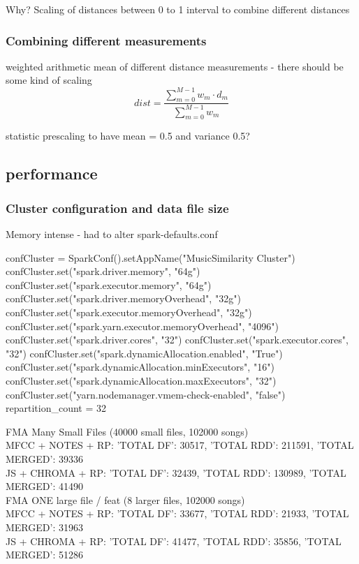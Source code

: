 Why? Scaling of distances between 0 to 1 interval to combine different distances\\

\subsubsection{Combining different measurements}

weighted arithmetic mean of different distance measurements - there should be some kind of scaling \cite[pp. 543ff]{musicdata}\\

\begin{equation} \label{eq:distance}
dist = \frac{\sum_{m = 0}^{M - 1}{w_m \cdot d_m}}{\sum_{m = 0}^{M - 1}{w_m}}
\end{equation}

statistic prescaling to have mean = 0.5 and variance 0.5?\\


\subsection{performance}\label{sparkperf}

\subsubsection{Cluster configuration and data file size}

Memory intense - had to alter spark-defaults.conf\\

\begin{pythonCode}[frame=single,label={lst:clust},caption={cluster setup},captionpos=b]
confCluster = SparkConf().setAppName("MusicSimilarity Cluster")
confCluster.set("spark.driver.memory", "64g")
confCluster.set("spark.executor.memory", "64g")
confCluster.set("spark.driver.memoryOverhead", "32g")
confCluster.set("spark.executor.memoryOverhead", "32g")
confCluster.set("spark.yarn.executor.memoryOverhead", "4096")
confCluster.set("spark.driver.cores", "32")
confCluster.set("spark.executor.cores", "32")
confCluster.set("spark.dynamicAllocation.enabled", "True")
confCluster.set("spark.dynamicAllocation.minExecutors", "16")
confCluster.set("spark.dynamicAllocation.maxExecutors", "32")
confCluster.set("yarn.nodemanager.vmem-check-enabled", "false")
repartition_count = 32
\end{pythonCode}

\noindent FMA Many Small Files (40000 small files, 102000 songs)\\
MFCC + NOTES + RP:      {'TOTAL DF': 30517, 'TOTAL RDD': 211591, 'TOTAL MERGED': 39336}\\
JS + CHROMA + RP:       {'TOTAL DF': 32439, 'TOTAL RDD': 130989, 'TOTAL MERGED': 41490}\\                               
FMA ONE large file / feat (8 larger files, 102000 songs)\\
MFCC + NOTES + RP:      {'TOTAL DF': 33677, 'TOTAL RDD': 21933, 'TOTAL MERGED': 31963}\\
JS + CHROMA + RP:       {'TOTAL DF': 41477, 'TOTAL RDD': 35856, 'TOTAL MERGED': 51286}    
                                    

